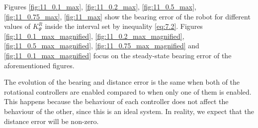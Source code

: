 Figures \ref{fig:11_0.1_max}, \ref{fig:11_0.2_max}, \ref{fig:11_0.5_max},
\ref{fig:11_0.75_max}, \ref{fig:11_max} show the bearing error of the robot
for different values of $K_{\Psi}^R$ inside the interval set by inequality
\ref{eq:7.2}. Figures \ref{fig:11_0.1_max_magnified},
\ref{fig:11_0.2_max_magnified}, \ref{fig:11_0.5_max_magnified},
\ref{fig:11_0.75_max_magnified} and \ref{fig:11_0.1_max_magnified} focus on the
steady-state bearing error of the aforementioned figures.

The evolution of the bearing and distance error is the same when both of the
rotational controllers are enabled compared to when only one of them is enabled.
This happens because the behaviour of each controller does not affect the
behaviour of the other, since this is an ideal system. In reality, we expect
that the distance error will be non-zero.

\noindent{}

\noindent{}

